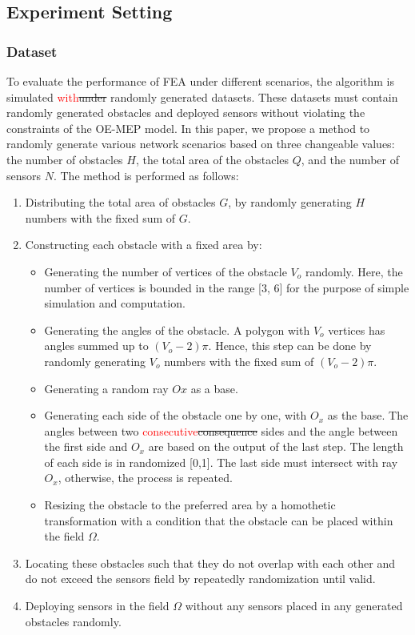 \documentclass[final]{elsarticle}
\begin{document}
\subsection{Experiment Setting}
\subsubsection{Dataset}
To evaluate the performance of FEA under different scenarios, the algorithm is simulated \textcolor{red}{with}\sout{under} randomly generated datasets. These datasets must contain randomly generated obstacles and deployed sensors without violating the constraints of the OE-MEP model. In this paper, we propose a method to randomly generate various network scenarios based on three changeable values: the number of obstacles $H$, the total area of the obstacles $Q$, and the number of sensors $N$. The method is performed as follows: 

\begin{enumerate}
	\item Distributing the total area of obstacles $G$, by randomly generating $H$ numbers with the fixed sum of $G$.
	\item Constructing each obstacle with a fixed area by:
	\begin{itemize}
		\item Generating the number of vertices of the obstacle $V_o$ randomly. Here, the number of vertices is bounded in the range [3, 6] for the purpose of simple simulation and computation. 
		\item Generating the angles of the obstacle. A polygon with $V_o$ vertices has angles summed up to $(V_o - 2)\pi$. Hence, this step can be done by randomly generating $V_o$ numbers with the fixed sum of $(V_o - 2)\pi$.
		\item Generating a random ray $Ox$ as a base.
		\item Generating each side of the obstacle one by one, with $O_x$ as the base. The angles between two \textcolor{red}{consecutive}\sout{consequence} sides and the angle between the first side and $O_x$ are based on the output of the last step. The length of each side is in randomized [0,1]. The last side must intersect with ray $O_x$, otherwise, the process is repeated.
		\item Resizing the obstacle to the preferred area by a homothetic transformation with a condition that the obstacle can be placed within the field $\Omega$.
	\end{itemize}
	\item Locating these obstacles such that they do not overlap with each other and do not exceed the sensors field by repeatedly randomization until valid.
	\item Deploying sensors in the field $\Omega$ without any sensors placed in any generated obstacles randomly.
\end{enumerate}
\end{document}
